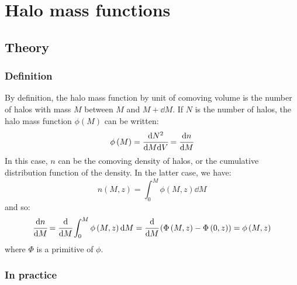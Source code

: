 \chapter{Halo mass functions}
\label{cha:halo_mass_functions}
\minitoc%

\section{Theory}

\subsection{Definition}

By definition, the halo mass function by unit of comoving volume is the
number of halos with mass $M$ between $M$ and $M+\dd{M}$. If $N$ is
the number of halos, the halo mass function $\phi\left(M\right)$ can be
written:
%
\begin{equation}
    \phi\left(M\right)=\cfrac{{\rm{d}} N^2}{{\rm{d}} M{\rm{d}} V}=\cfrac{{\rm{d}} n}{{\rm{d}} M}
\end{equation}
%
In this case, $n$ can be the comoving density of halos, or the cumulative
distribution function of the density. In the latter case, we have:
%
\begin{equation}
    n\left(M,z\right)=\int_0^M\phi\left(M,z\right)\dd M
\end{equation}
%
and so:
%
\begin{equation}
    \cfrac{{\rm{d}} n}{{\rm{d}} M}=\cfrac{{\rm{d}}}{{\rm{d}} M}\int_0^M\phi\left(M,z\right){\rm{d}} M=
    \cfrac{{\rm{d}}}{{\rm{d}} M}\left(\Phi\left(M,z\right)-\Phi\left(0,z\right)\right)=
    \phi\left(M,z\right)
\end{equation}
%
where $\Phi$ is a primitive of $\phi$.

\subsection{In practice}

